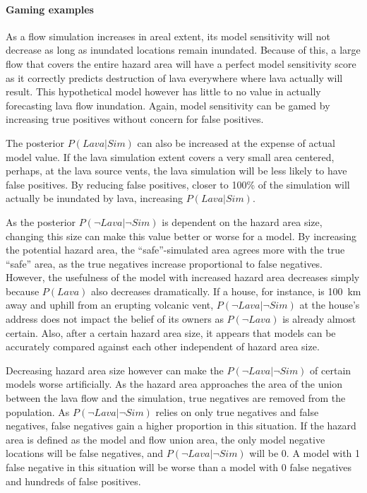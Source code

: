 \documentclass[12pt,letter]{article}
\begin{document}
			\paragraph{Gaming examples}
			As a flow simulation increases in areal extent, its model sensitivity will not decrease as long as inundated locations remain inundated. Because of this, a large flow that covers the entire hazard area will have a perfect model sensitivity score as it correctly predicts destruction of lava everywhere where lava actually will result. This hypothetical model however has little to no value in actually forecasting lava flow inundation. Again, model sensitivity can be gamed by increasing true positives without concern for false positives. 

			The posterior $P(Lava|Sim)$ can also be increased at the expense of actual model value. If the lava simulation extent covers a very small area centered, perhaps, at the lava source vents, the lava simulation will be less likely to have false positives. By reducing false positives, closer to 100\% of the simulation will actually be inundated by lava, increasing $P(Lava|Sim)$.

			As the posterior $P(\neg Lava|\neg Sim)$ is dependent on the hazard area size, changing this size can make this value better or worse for a model. By increasing the potential hazard area, the ``safe''-simulated area agrees more with the true ``safe'' area, as the true negatives increase proportional to false negatives. However, the usefulness of the model with increased hazard area decreases simply because $P(Lava)$ also decreases dramatically. If a house, for instance, is 100~km away and uphill from an erupting volcanic vent, $P(\neg Lava|\neg Sim)$ at the house's address does not impact the belief of its owners as $P(\neg Lava)$ is already almost certain. Also, after a certain hazard area size, it appears that models can be accurately compared against each other independent of hazard area size.

			Decreasing hazard area size however can make the  $P(\neg Lava|\neg Sim)$ of certain models worse artificially. As the hazard area approaches the area of the union between the lava flow and the simulation, true negatives are removed from the population. As $P(\neg Lava|\neg Sim)$ relies on only true negatives and false negatives, false negatives gain a higher proportion in this situation. If the hazard area is defined as the model and flow union area, the only model negative locations will be false negatives, and $P(\neg Lava|\neg Sim)$ will be 0. A model with 1 false negative in this situation will be worse than a model with 0 false negatives and hundreds of false positives.
\end{document}
